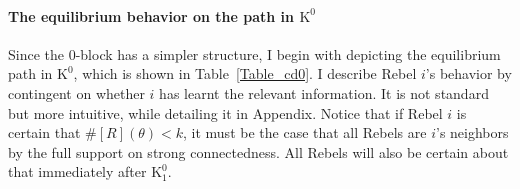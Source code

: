 \documentclass[12pt,letter]{article}
\newcommand{\Kappa}{\mathrm{K}}
\theoremstyle{definition}
\theoremstyle{remark}
\theoremstyle{claim}
\begin{document}
\paragraph{The equilibrium behavior on the path in $\Kappa^0$}
Since the $0$-block has a simpler structure, I begin with depicting the equilibrium path in $\Kappa^0$, which is shown in Table~\ref{Table_cd0}. I describe Rebel $i$'s behavior by contingent on whether $i$ has learnt the relevant information. It is not standard but more intuitive, while detailing it in Appendix. Notice that if Rebel $i$ is certain that $\#[R](\theta)<k$, it must be the case that all Rebels are $i$'s neighbors by the full support on strong connectedness. All Rebels will also be certain about that immediately after $\Kappa^0_{1}$. 
%
%
%
%    
%    
%        
\end{document}
